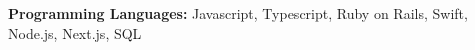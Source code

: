 \textbf{Programming Languages:} Javascript, Typescript, Ruby on Rails, Swift, Node.js, Next.js, SQL \\
